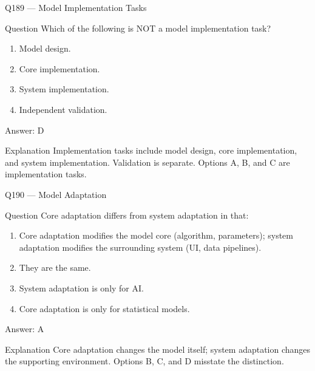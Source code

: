 \documentclass[aspectratio=169,8pt]{beamer}
\begin{document}
\begin{frame}{Q189 --- Model Implementation Tasks}
\begin{block}{Question}
Which of the following is NOT a model implementation task?
\begin{enumerate}
\item Model design.
\item Core implementation.
\item System implementation.
\item Independent validation.
\end{enumerate}  \end{block}
\begin{exampleblock}{Answer: D}\end{exampleblock}
\begin{block}{Explanation}
Implementation tasks include model design, core implementation, and system implementation. Validation is separate. Options A, B, and C are implementation tasks.
\end{block}
\end{frame}

\begin{frame}{Q190 --- Model Adaptation}
\begin{block}{Question}
Core adaptation differs from system adaptation in that:
\begin{enumerate}
	\item Core adaptation modifies the model core (algorithm, parameters); system adaptation modifies the surrounding system (UI, data pipelines).
	\item They are the same.
	\item System adaptation is only for AI.
	\item Core adaptation is only for statistical models.
\end{enumerate}  \end{block}
\begin{exampleblock}{Answer: A}\end{exampleblock}
\begin{block}{Explanation}
	Core adaptation changes the model itself; system adaptation changes the supporting environment. Options B, C, and D misstate the distinction.
\end{block}
\end{frame}
\end{document}
